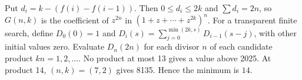 Put $d_i=k-(f(i)-f(i-1))$. Then $0\le d_i\le2k$ and $\sum d_i=2n$, so $G(n,k)$ is the coefficient of $z^{2n}$ in $(1+z+\cdots+z^{2k})^n$. For a transparent finite search, define $D_0(0)=1$ and $D_i(s)=\sum_{j=0}^{\min(2k,s)}D_{i-1}(s-j)$, with other initial values zero. Evaluate $D_n(2n)$ for each divisor $n$ of each candidate product $kn=1,2,\ldots$. No product at most 13 gives a value above 2025. At product 14, $(n,k)=(7,2)$ gives 8135. Hence the minimum is $\boxed{14}$.
